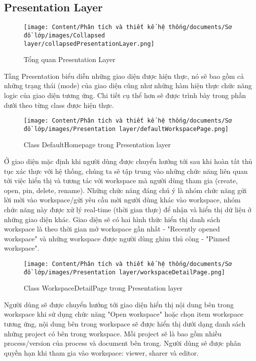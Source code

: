 \subsection{Presentation Layer}
\begin{figure}[H]
    \centering
    \texttt{[image: Content/Phân tích và thiết kế hệ thống/documents/Sơ đồ lớp/images/Collapsed layer/collapsedPresentationLayer.png]}
    \vspace{0.5cm}
    \caption{Tổng quan Presentation Layer}
    \label{fig:Tổng quan Presentation layer}
\end{figure}
Tầng Presentation biểu diễn những giao diện được hiện thực, nó sẽ bao gồm cả những trạng thái (mode) của giao diện cũng như những hàm hiện thực chức năng logic của giao diện tương ứng.
Chi tiết cụ thể hơn sẽ được trình bày trong phần dưới theo từng class được hiện thực.

\begin{figure}[H]
    \centering
    \texttt{[image: Content/Phân tích và thiết kế hệ thống/documents/Sơ đồ lớp/images/Presentation layer/defaultWorkspacePage.png]}
    \vspace{0.5cm}
    \caption{Class DefaultHomepage trong Presentation layer}
    \label{fig:Class Default homepage trong Presentation layer}
\end{figure}
Ở giao diện mặc định khi người dùng được chuyển hướng tới sau khi hoàn tất thủ tục xác thực với hệ thống, chúng ta sẽ tập trung vào những chức năng liên quan tới việc hiển thị và tương tác với workspace mà người dùng tham gia (create, open, pin, delete, rename). Những chức năng đáng chú ý là nhóm chức năng gửi lời mời vào workspace/gửi yêu cầu mời người dùng khác vào workspace, nhóm chức năng này được xử lý real-time (thời gian thực) để nhận và hiển thị dữ liệu ở những giao diện khác. Giao diện sẽ có hai hình thức hiển thị danh sách workspace là theo thời gian mở workspace gần nhất - "Recently opened workspace" và những workspace được người dùng ghim thủ công - "Pinned workspace".

\begin{figure}[H]
    \centering
    \texttt{[image: Content/Phân tích và thiết kế hệ thống/documents/Sơ đồ lớp/images/Presentation layer/workspaceDetailPage.png]}
    \vspace{0.5cm}
    \caption{Class WorkspaceDetailPage trong Presentation layer}
    \label{fig:Class WorkspaceDetailPage trong Presentation layer}
\end{figure}
Người dùng sẽ được chuyển hướng tới giao diện hiển thị nội dung bên trong workspace khi sử dụng chức năng "Open workspace" hoặc chọn item workspace tương ứng, nội dung bên trong workspace sẽ được hiển thị dưới dạng danh sách những project có bên trong workspace. Mỗi project sẽ là bao gồm nhiều process/version của process và document bên trong. Người dùng sẽ được phân quyền hạn khi tham gia vào workspace: viewer, sharer và editor.

